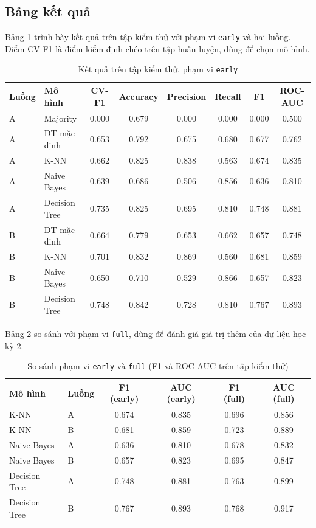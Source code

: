 \documentclass[12pt,a4paper]{article}
\begin{document}
\subsection{Bảng kết quả}
Bảng \ref{tab:results} trình bày kết quả trên tập kiểm thử với phạm vi \texttt{early} và hai luồng. Điểm CV-F1 là điểm kiểm định chéo trên tập huấn luyện, dùng để chọn mô hình.

\begin{table}[H]
\centering
\caption{Kết quả trên tập kiểm thử, phạm vi \texttt{early}}
\label{tab:results}
\small
\begin{tabular}{llcccccc}
\toprule
Luồng & Mô hình & CV-F1 & Accuracy & Precision & Recall & F1 & ROC-AUC \\
\midrule
A & Majority & 0.000 & 0.679 & 0.000 & 0.000 & 0.000 & 0.500 \\
A & DT mặc định & 0.653 & 0.792 & 0.675 & 0.680 & 0.677 & 0.762 \\
A & K-NN & 0.662 & 0.825 & 0.838 & 0.563 & 0.674 & 0.835 \\
A & Naive Bayes & 0.639 & 0.686 & 0.506 & 0.856 & 0.636 & 0.810 \\
A & Decision Tree & 0.735 & 0.825 & 0.695 & 0.810 & 0.748 & 0.881 \\
\midrule
B & DT mặc định & 0.664 & 0.779 & 0.653 & 0.662 & 0.657 & 0.748 \\
B & K-NN & 0.701 & 0.832 & 0.869 & 0.560 & 0.681 & 0.859 \\
B & Naive Bayes & 0.650 & 0.710 & 0.529 & 0.866 & 0.657 & 0.823 \\
B & Decision Tree & 0.748 & 0.842 & 0.728 & 0.810 & 0.767 & 0.893 \\
\bottomrule
\end{tabular}
\end{table}

\noindent Bảng \ref{tab:full} so sánh với phạm vi \texttt{full}, dùng để đánh giá giá trị thêm của dữ liệu học kỳ 2.

\begin{table}[H]
\centering
\caption{So sánh phạm vi \texttt{early} và \texttt{full} (F1 và ROC-AUC trên tập kiểm thử)}
\label{tab:full}
\begin{tabular}{llcccc}
\toprule
Mô hình & Luồng & F1 (early) & AUC (early) & F1 (full) & AUC (full) \\
\midrule
K-NN & A & 0.674 & 0.835 & 0.696 & 0.856 \\
K-NN & B & 0.681 & 0.859 & 0.723 & 0.889 \\
Naive Bayes & A & 0.636 & 0.810 & 0.678 & 0.832 \\
Naive Bayes & B & 0.657 & 0.823 & 0.695 & 0.847 \\
Decision Tree & A & 0.748 & 0.881 & 0.763 & 0.899 \\
Decision Tree & B & 0.767 & 0.893 & 0.768 & 0.917 \\
\bottomrule
\end{tabular}
\end{table}
\end{document}
